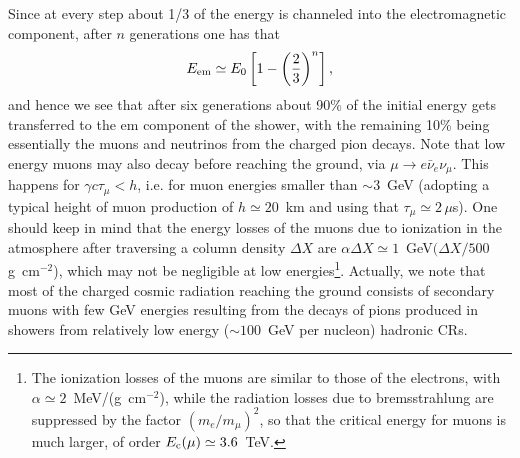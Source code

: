 \documentclass[twoside,12pt]{article}
\newcommand{\be}{\begin{equation}}
\newcommand{\ee}{\end{equation}}
\begin{document}
Since at every step about 1/3 of the energy is channeled into the electromagnetic component, after $n$ generations one has that
\be 
E_{\rm em}\simeq E_0\left[1-\left(\frac{2}{3}\right)^n\right],
\ee 
and hence we see that after  six generations about 90\% of the initial energy gets transferred to the em component of the shower, with the remaining 10\% being essentially the muons and neutrinos from the charged pion decays. Note that low energy muons may also decay before reaching the ground, via $\mu\to e\bar{\nu}_e\nu_\mu$. This happens for $\gamma c \tau_\mu<h$, i.e. for muon  energies smaller than $\sim 3$~GeV (adopting  a typical height of muon production of $h\simeq 20$~km and using that $\tau_\mu\simeq 2\,\mu$s).  
One should keep in mind that the energy losses of the muons due to ionization in the atmosphere after traversing a column density $\Delta X$ are $\alpha\Delta X\simeq 1$~GeV$(\Delta X/500$\,g~cm$^{-2}$), which may not be negligible at low energies\footnote{The ionization losses of the muons are similar to those of the electrons, with $\alpha\simeq 2$~MeV/(g~cm$^{-2}$), while the radiation losses due to bremsstrahlung are suppressed by the factor $(m_e/m_\mu)^2$, so that the critical energy for muons is much larger, of order $E_{\rm c}(\mu)\simeq 3.6$~TeV.}. Actually, we note that  most of the charged cosmic radiation reaching the ground consists of  secondary muons with  few GeV energies  resulting from the decays of pions produced in showers from relatively low energy ($\sim 100$~GeV per nucleon) hadronic CRs.
\end{document}
